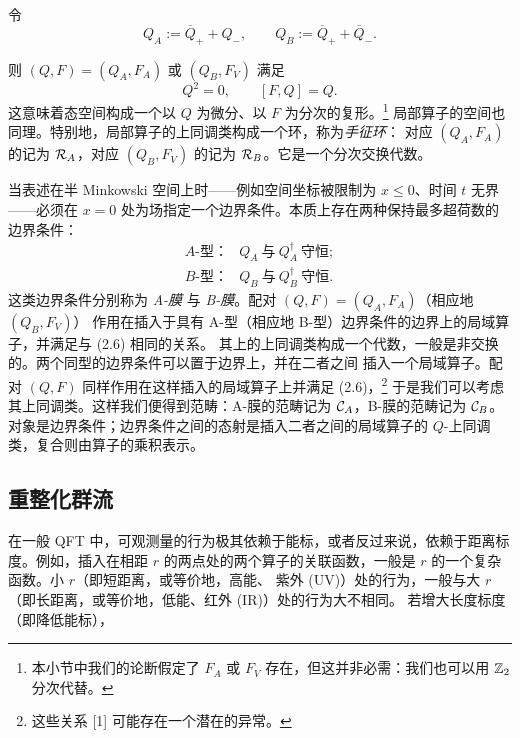 令
\begin{equation}
  Q_A:=\overline Q_++Q_-,\qquad Q_B:=\overline Q_++\overline Q_-. \tag{2.5}
\end{equation}

则 $(Q,F)=(Q_A,F_A)$ 或 $(Q_B,F_V)$ 满足
\begin{equation}
  Q^2=0,\qquad [F,Q]=Q. \tag{2.6}
\end{equation}
这意味着态空间构成一个以 $Q$ 为微分、以 $F$ 为分次的复形。\footnote{本小节中我们的论断假定了
$F_A$ 或 $F_V$ 存在，但这并非必需：我们也可以用 $\mathbb{Z}_2$ 分次代替。}%
局部算子的空间也同理。特别地，局部算子的上同调类构成一个环，称为\emph{手征环}：
对应 $(Q_A,F_A)$ 的记为 $\mathcal{R}_A$，对应 $(Q_B,F_V)$ 的记为 $\mathcal{R}_B$。它是一个分次交换代数。

当表述在半 Minkowski 空间上时——例如空间坐标被限制为 $x\le 0$、时间 $t$ 无界——必须在 $x=0$
处为场指定一个边界条件。本质上存在两种保持最多超荷数的边界条件：
\[
\begin{array}{ll}
A\text{-型：} & Q_A\ \text{与}\ Q_A^\dagger\ \text{守恒};\\[2pt]
B\text{-型：} & Q_B\ \text{与}\ Q_B^\dagger\ \text{守恒}.
\end{array}
\]
这类边界条件分别称为 \emph{A-膜} 与 \emph{B-膜}。配对 $(Q,F)=(Q_A,F_A)$（相应地 $(Q_B,F_V)$）
作用在插入于具有 A-型（相应地 B-型）边界条件的边界上的局域算子，并满足与 (2.6) 相同的关系。
其上的上同调类构成一个代数，一般是非交换的。两个同型的边界条件可以置于边界上，并在二者之间
插入一个局域算子。配对 $(Q,F)$ 同样作用在这样插入的局域算子上并满足 (2.6)，\footnote{这些关系
[1] 可能存在一个潜在的异常。} 于是我们可以考虑其上同调类。这样我们便得到范畴：A-膜的范畴记为
$\mathcal{C}_A$，B-膜的范畴记为 $\mathcal{C}_B$。对象是边界条件；边界条件之间的态射是插入二者之间的局域算子的
$Q$-上同调类，复合则由算子的乘积表示。

\subsection{重整化群流}
\label{sec:RG}

在一般 QFT 中，可观测量的行为极其依赖于能标，或者反过来说，依赖于距离标度。例如，插入在相距
$r$ 的两点处的两个算子的关联函数，一般是 $r$ 的一个复杂函数。小 $r$（即短距离，或等价地，高能、
紫外 (UV)）处的行为，一般与大 $r$（即长距离，或等价地，低能、红外 (IR)）处的行为大不相同。
若增大长度标度（即降低能标），
